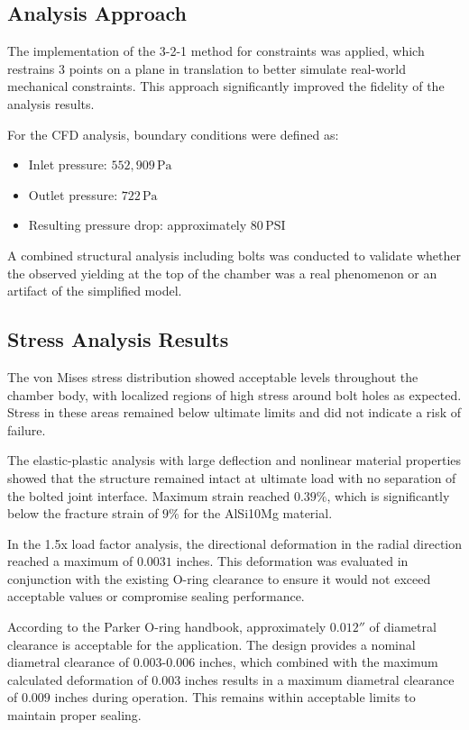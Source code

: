  
\subsection{Analysis Approach}

The implementation of the 3-2-1 method for constraints was applied, which restrains 3 points on a plane in translation to better simulate real-world mechanical constraints. This approach significantly improved the fidelity of the analysis results.

For the CFD analysis, boundary conditions were defined as:
\begin{itemize}
    \item Inlet pressure: $552,909\,\text{Pa}$
    \item Outlet pressure: $722\,\text{Pa}$
    \item Resulting pressure drop: approximately $80\,\text{PSI}$
\end{itemize}

A combined structural analysis including bolts was conducted to validate whether the observed yielding at the top of the chamber was a real phenomenon or an artifact of the simplified model. 

\subsection{Stress Analysis Results}

The von Mises stress distribution showed acceptable levels throughout the chamber body, with localized regions of high stress around bolt holes as expected. Stress in these areas remained below ultimate limits and did not indicate a risk of failure.

The elastic-plastic analysis with large deflection and nonlinear material properties showed that the structure remained intact at ultimate load with no separation of the bolted joint interface. Maximum strain reached $0.39\%$, which is significantly below the fracture strain of $9\%$ for the AlSi10Mg material.

In the 1.5x load factor analysis, the directional deformation in the radial direction reached a maximum of $0.0031$ inches. This deformation was evaluated in conjunction with the existing O-ring clearance to ensure it would not exceed acceptable values or compromise sealing performance.

According to the Parker O-ring handbook, approximately $0.012''$ of diametral clearance is acceptable for the application. The design provides a nominal diametral clearance of $0.003$-$0.006$ inches, which combined with the maximum calculated deformation of $0.003$ inches results in a maximum diametral clearance of $0.009$ inches during operation. This remains within acceptable limits to maintain proper sealing.

